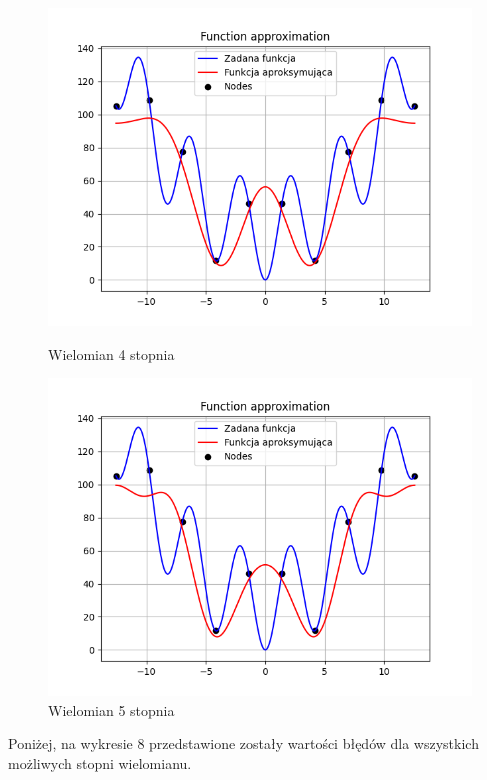 \documentclass{article}
\begin{document}
\begin{figure}[H]
\begin{minipage}[b]{0.49\textwidth}
    \begin{minipage}[b]{\textwidth}
      \includegraphics[width=\textwidth]{img06.png}
      \caption{Wielomian 4 stopnia}
    \end{minipage}
    \vspace*{\fill}
    \begin{minipage}[b]{\textwidth}
      \includegraphics[width=\textwidth]{img07.png}
      \caption{Wielomian 5 stopnia}
    \end{minipage}
  \end{minipage}
\end{figure}

\noindent
Poniżej, na wykresie 8 przedstawione zostały wartości błędów dla wszystkich możliwych stopni wielomianu.
\end{document}
